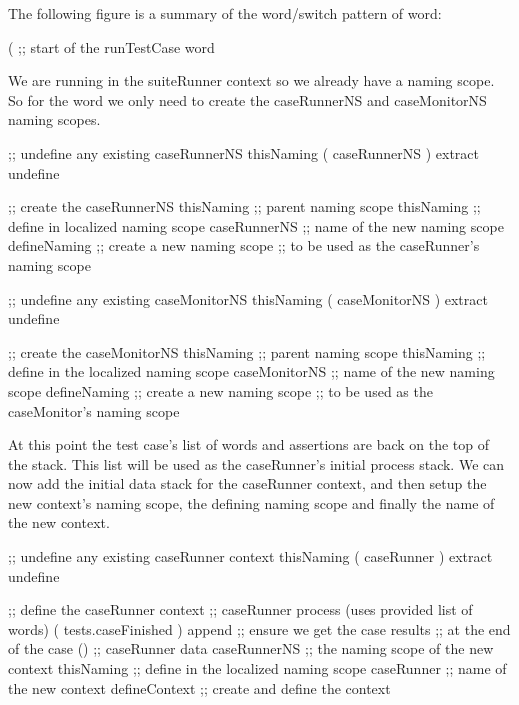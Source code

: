 The following figure is a summary of the word/switch pattern of 
 word: 


\startJoylolCode
(               ;; start of the runTestCase word
\stopJoylolCode

We are running in the suiteRunner context so we already have a 
 naming scope. So for the  word we only 
need to create the caseRunnerNS and caseMonitorNS naming scopes. 

\startJoylolCode
  ;; undefine any existing caseRunnerNS
  thisNaming
  ( caseRunnerNS ) extract
  undefine

  ;; create the caseRunnerNS
  thisNaming   ;; parent naming scope
  thisNaming   ;; define in localized naming scope
  caseRunnerNS ;; name of the new naming scope
  defineNaming ;; create a new naming scope
               ;; to be used as the caseRunner's naming scope
\stopJoylolCode

\startJoylolCode
  ;; undefine any existing caseMonitorNS
  thisNaming
  ( caseMonitorNS ) extract
  undefine

  ;; create the caseMonitorNS
  thisNaming    ;; parent naming scope
  thisNaming    ;; define in the localized naming scope
  caseMonitorNS ;; name of the new naming scope
  defineNaming  ;; create a new naming scope
                ;; to be used as the caseMonitor's naming scope
\stopJoylolCode

At this point the test case's list of words and assertions are back on the 
top of the stack. This list will be used as the caseRunner's initial 
process stack. We can now add the initial data stack for the caseRunner 
context, and then setup the new context's naming scope, the defining 
naming scope and finally the name of the new context.

\startJoylolCode
  ;; undefine any existing caseRunner context
  thisNaming
  ( caseRunner ) extract
  undefine

  ;; define the caseRunner context
                ;; caseRunner process (uses provided list of words)
  ( tests.caseFinished )
  append        ;; ensure we get the case results
                ;; at the end of the case
  ()            ;; caseRunner data
  caseRunnerNS  ;; the naming scope of the new context
  thisNaming    ;; define in the localized naming scope
  caseRunner    ;; name of the new context
  defineContext ;; create and define the context
\stopJoylolCode

